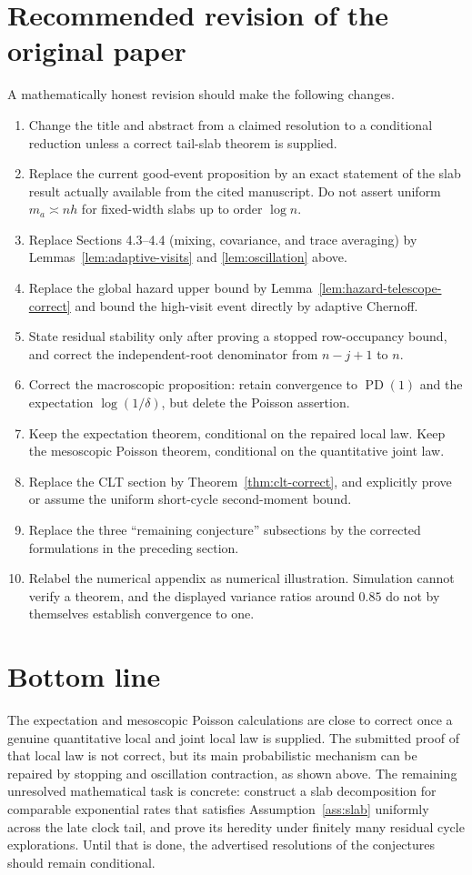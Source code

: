 \documentclass[11pt]{article}
\newcommand{\1}{\mathbf 1}
\newcommand{\PD}{\operatorname{PD}(1)}
\theoremstyle{remark}
\begin{document}
\section{Recommended revision of the original paper}

A mathematically honest revision should make the following changes.

\begin{enumerate}[label=\arabic*.]
\item Change the title and abstract from a claimed resolution to a conditional
reduction unless a correct tail-slab theorem is supplied.
\item Replace the current good-event proposition by an exact statement of the
slab result actually available from the cited manuscript.  Do not assert
uniform $m_a\asymp nh$ for fixed-width slabs up to order $\log n$.
\item Replace Sections 4.3--4.4 (mixing, covariance, and trace averaging) by
Lemmas~\ref{lem:adaptive-visits} and \ref{lem:oscillation} above.
\item Replace the global hazard upper bound by
Lemma~\ref{lem:hazard-telescope-correct} and bound the high-visit event
directly by adaptive Chernoff.
\item State residual stability only after proving a stopped row-occupancy
bound, and correct the independent-root denominator from $n-j+1$ to $n$.
\item Correct the macroscopic proposition: retain convergence to $\PD$ and the
expectation $\log(1/\delta)$, but delete the Poisson assertion.
\item Keep the expectation theorem, conditional on the repaired local law.
Keep the mesoscopic Poisson theorem, conditional on the quantitative joint
law.
\item Replace the CLT section by Theorem~\ref{thm:clt-correct}, and explicitly
prove or assume the uniform short-cycle second-moment bound.
\item Replace the three ``remaining conjecture'' subsections by the corrected
formulations in the preceding section.
\item Relabel the numerical appendix as numerical illustration.  Simulation
cannot verify a theorem, and the displayed variance ratios around $0.85$ do
not by themselves establish convergence to one.
\end{enumerate}

\section{Bottom line}

The expectation and mesoscopic Poisson calculations are close to correct once
a genuine quantitative local and joint local law is supplied.  The submitted
proof of that local law is not correct, but its main probabilistic mechanism
can be repaired by stopping and oscillation contraction, as shown above.  The
remaining unresolved mathematical task is concrete: construct a slab
decomposition for comparable exponential rates that satisfies
Assumption~\ref{ass:slab} uniformly across the late clock tail, and prove its
heredity under finitely many residual cycle explorations.  Until that is done,
the advertised resolutions of the conjectures should remain conditional.
\end{document}
